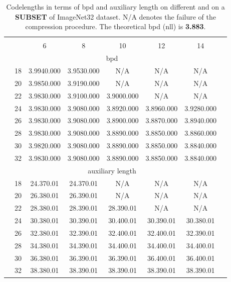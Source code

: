 \documentclass{article}
\newcommand{\ebar}[1]{{\tiny #1}}
\begin{document}
\begin{table}[ht]
\centering
\caption{Codelengths in terms of bpd and auxiliary length on different  and  on a \textbf{SUBSET} of ImageNet32 dataset. N/A denotes the failure of the compression procedure. The theoretical bpd (nll) is \textbf{3.883}.}
\small
\label{tab:hparam_img32}
\begin{tabular}{cccccccc}
\toprule
    & & \multicolumn{5}{c}{} \\
     &  & 6 & 8 & 10 & 12 & 14 \\
    \midrule
    \multicolumn{7}{c}{bpd} \\
    \midrule
    \multirow{8}{*}{} & 18 & 3.994\ebar{0.000} & 3.953\ebar{0.000} & N/A & N/A & N/A \\
        & 20 & 3.985\ebar{0.000} & 3.919\ebar{0.000} & N/A & N/A & N/A \\
        & 22 & 3.983\ebar{0.000} & 3.910\ebar{0.000} & 3.900\ebar{0.000} & N/A & N/A \\
        & 24 & 3.983\ebar{0.000} & 3.908\ebar{0.000} & 3.892\ebar{0.000} & 3.896\ebar{0.000} & 3.928\ebar{0.000} \\
        & 26 & 3.983\ebar{0.000} & 3.908\ebar{0.000} & 3.890\ebar{0.000} & 3.887\ebar{0.000} & 3.894\ebar{0.000} \\
        & 28 & 3.983\ebar{0.000} & 3.908\ebar{0.000} & 3.889\ebar{0.000} & 3.885\ebar{0.000} & 3.886\ebar{0.000} \\
        & 30 & 3.982\ebar{0.000} & 3.908\ebar{0.000} & 3.889\ebar{0.000} & 3.885\ebar{0.000} & 3.884\ebar{0.000} \\
        & 32 & 3.983\ebar{0.000} & 3.908\ebar{0.000} & 3.889\ebar{0.000} & 3.885\ebar{0.000} & 3.884\ebar{0.000} \\
    \midrule
    \multicolumn{7}{c}{auxiliary length} \\
    \midrule
    \multirow{8}{*}{} & 18 & 24.37\ebar{0.01} & 24.37\ebar{0.01} & N/A & N/A & N/A \\
        & 20 & 26.38\ebar{0.01} & 26.39\ebar{0.01} & N/A & N/A & N/A \\
        & 22 & 28.38\ebar{0.01} & 28.39\ebar{0.01} & 28.39\ebar{0.01} & N/A & N/A \\
        & 24 & 30.38\ebar{0.01} & 30.39\ebar{0.01} & 30.40\ebar{0.01} & 30.39\ebar{0.01} & 30.38\ebar{0.01} \\
        & 26 & 32.38\ebar{0.01} & 32.39\ebar{0.01} & 32.40\ebar{0.01} & 32.40\ebar{0.01} & 32.39\ebar{0.01} \\
        & 28 & 34.38\ebar{0.01} & 34.39\ebar{0.01} & 34.40\ebar{0.01} & 34.40\ebar{0.01} & 34.40\ebar{0.01} \\
        & 30 & 36.38\ebar{0.01} & 36.39\ebar{0.01} & 36.39\ebar{0.01} & 36.40\ebar{0.01} & 36.40\ebar{0.01} \\
        & 32 & 38.38\ebar{0.01} & 38.39\ebar{0.01} & 38.39\ebar{0.01} & 38.39\ebar{0.01} & 38.39\ebar{0.01} \\
\bottomrule
\end{tabular}
\end{table}
\end{document}
